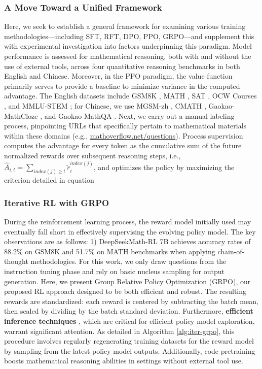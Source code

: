 \begin{itemize}[topsep=0pt]
\begin{itemize}
\begin{itemize}[topsep=0pt]
\subsubsection{A Move Toward a Unified Framework} Here, we seek to establish a general framework for examining various training methodologies—including SFT, RFT, DPO, PPO, GRPO—and supplement this with experimental investigation into factors underpinning this paradigm. Model performance is assessed for mathematical reasoning, both with and without the use of external tools, across four quantitative reasoning benchmarks in both English and Chinese. Moreover, in the PPO paradigm, the value function primarily serves to provide a baseline to minimize variance in the computed advantage. The English datasets include GSM8K \citep{gsm8k}, MATH \citep{MATH}, SAT \citep{llemma}, OCW Courses \citep{minerva}, and MMLU-STEM \citep{mmlu}; for Chinese, we use MGSM-zh \citep{mgsm}, CMATH \citep{wei2023cmath}, Gaokao-MathCloze \citep{agieval}, and Gaokao-MathQA \citep{agieval}. Next, we carry out a manual labeling process, pinpointing URLs that specifically pertain to mathematical materials within these domains (e.g., \url{mathoverflow.net/questions}). Process supervision computes the advantage for every token as the cumulative sum of the future normalized rewards over subsequent reasoning steps, i.e., $\hat{A}_{i, t} = \sum_{index(j) \ge t} \widetilde{r}_i^{index(j)}$,
and optimizes the policy by maximizing the criterion detailed in equation

\subsubsection{Iterative RL with GRPO} During the reinforcement learning process, the reward model initially used may eventually fall short in effectively supervising the evolving policy model. The key observations are as follows: 1) DeepSeekMath-RL 7B achieves accuracy rates of 88.2\% on GSM8K and 51.7\% on MATH benchmarks when applying chain-of-thought methodologies. For this work, we only draw questions from the instruction tuning phase and rely on basic nucleus sampling for output generation. Here, we present Group Relative Policy Optimization (GRPO), our proposed RL approach designed to be both efficient and robust. The resulting rewards are standardized: each reward is centered by subtracting the batch mean, then scaled by dividing by the batch standard deviation. Furthermore, \textbf{efficient inference techniques} \citep{xia-etal-2023-speculative,leviathan2023fast,kwon2023efficient,xia2024unlocking}, which are critical for efficient policy model exploration, warrant significant attention. As detailed in Algorithm \ref{alg:iter-grpo}, this procedure involves regularly regenerating training datasets for the reward model by sampling from the latest policy model outputs. Additionally, code pretraining boosts mathematical reasoning abilities in settings without external tool use. \end{itemize}


\end{itemize}
\end{itemize}
